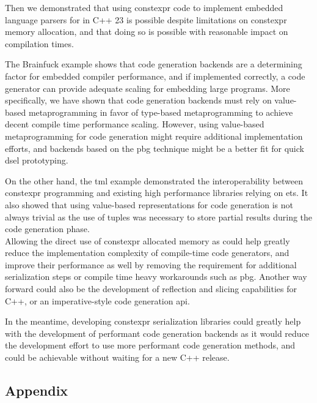 \documentclass[english,12pt,a4paper]{book}
\providecommand{\cpp}{\textsc{C++}\xspace}
\begin{document}
Then we demonstrated that using \gls{constexpr} code to
implement embedded language parsers for in \cpp23 is possible despite
limitations on \gls{constexpr} memory allocation, and that doing so is possible
with reasonable impact on compilation times.

The Brainfuck example shows that code generation backends are
a determining factor for embedded compiler performance,
and if implemented correctly, a code generator can provide
adequate scaling for embedding large programs.
More specifically, we have shown that code generation backends must rely on
value-based metaprogramming in favor of type-based metaprogramming to achieve
decent compile time performance scaling. However, using value-based
metaprogramming for code generation might require additional implementation
efforts, and backends based on the \gls{pbg} technique might be a better fit
for quick \gls{dsel} prototyping.

On the other hand, the \gls{tml} example demonstrated the interoperability
between \gls{constexpr} programming and existing high performance libraries
relying on \glspl{et}. It also showed that using value-based representations for
code generation is not always trivial as the use of tuples was necessary to
store partial results during the code generation phase.
\\

Allowing the direct use of \gls{constexpr} allocated memory as 
could help greatly reduce the implementation complexity of compile-time code
generators, and improve their performance as well by removing the requirement
for additional serialization steps or compile time heavy workarounds such as
\gls{pbg}.
Another way forward could also be the development of reflection and slicing
capabilities for \cpp, or an imperative-style code generation \gls{api}.

In the meantime, developing \gls{constexpr} serialization libraries could
greatly help with the development of performant code generation backends
as it would reduce the development effort to use more performant code generation
methods, and could be achievable without waiting for a new \cpp release.


%
%
%
%
%
%


\clearpage
\printglossaries

\clearpage
\printbibliography

\begin{appendices}
\chapter{Appendix}
\end{appendices}

\appendix


\end{document}
